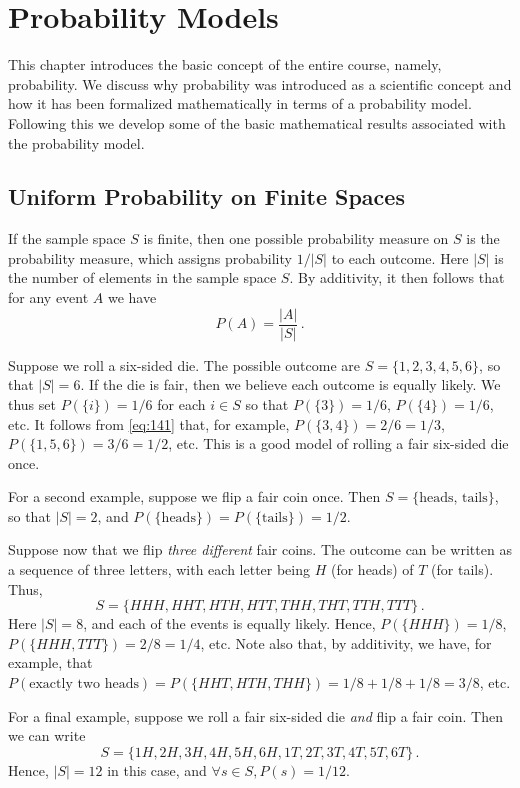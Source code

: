 \chapter{Probability Models}\label{chap:probability_models}
\minitoc
This chapter introduces the basic concept of the entire course, namely, probability. We discuss why probability was introduced as a scientific concept and how it has been formalized mathematically in terms of a probability model. Following this we develop some of the basic mathematical results associated with the probability model.





\section{Uniform Probability on Finite Spaces}\label{unif_prob_fint_spc}
If the sample space $S$ is finite, then one possible probability measure on $S$ is the  probability
measure, which assigns probability $1/|S|$ to each outcome. Here $|S|$ is the number of elements in the sample space
$S$. By additivity, it then follows that for any event $A$ we have
\begin{equation}
    \label{eq:141}
    P(A) = \frac{|A|}{|S|}\,.
\end{equation}
\begin{example}
    Suppose we roll a six-sided die. The possible outcome are $S=\{1,2,3,4,5,6\}$, so that $|S|=6$. If the die is
    fair, then we believe each outcome is equally likely. We thus set $P(\{i\})=1/6$ for each $i \in S$ so that
    $P(\{3\})=1/6$, $P(\{4\})=1/6$, etc. It follows from \autoref{eq:141} that, for example, $P(\{3,4\})=2/6=1/3$,
    $P(\{1,5,6\})=3/6=1/2$, etc. This is a good model of rolling a fair six-sided die once.
\end{example}
\begin{example}
    For a second example, suppose we flip a fair coin once. Then $S=\{\text{heads, tails}\}$, so that $|S|=2$, and
    $P(\{\text{heads}\})=P(\{\text{tails}\})=1/2$.
\end{example}
\begin{example}
    Suppose now that we flip \emph{three different} fair coins. The outcome can be written as a sequence of three
    letters, with each letter being $H$ (for heads) of $T$ (for tails). Thus,
    $$
    S = \{HHH, HHT, HTH, HTT, THH, THT, TTH, TTT\}\,.
    $$
    Here $|S|=8$, and each of the events is equally likely. Hence, $P(\{HHH\})=1/8$, $P(\{HHH,TTT\})=2/8=1/4$, etc.
    Note also that, by additivity, we have, for example, that $P(\text{exactly two heads}) = P(\{HHT, HTH,
    THH\})=1/8+1/8+1/8=3/8$, etc.
\end{example}
\begin{example}
    For a final example, suppose we roll a fair six-sided die \emph{and} flip a fair coin. Then we can write
    $$
    S=\{1H,2H,3H,4H,5H,6H,1T,2T, 3T, 4T, 5T, 6T\}\,.
    $$
    Hence, $|S|=12$ in this case, and $\forall s \in S, P(s)=1/12$.
\end{example}

